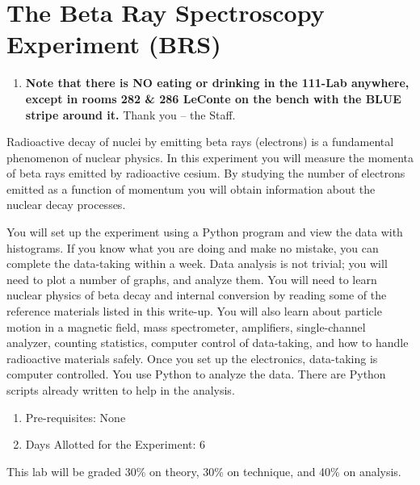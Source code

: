 \documentclass{../lab}
\begin{document}
\maketitle

\tableofcontents

\section{The Beta Ray Spectroscopy Experiment (BRS)}

\begin{enumerate}
    \item \textbf{Note that there is NO eating or drinking in the 111-Lab anywhere, except in rooms 282 \& 286 LeConte on the bench with the BLUE stripe around it.} Thank you -- the Staff.
\end{enumerate}

Radioactive decay of nuclei by emitting beta rays (electrons) is a fundamental phenomenon of nuclear physics. In this experiment you will measure the momenta of beta rays emitted by radioactive cesium. By studying the number of electrons emitted as a function of momentum you will obtain information about the nuclear decay processes.

You will set up the experiment using a Python program and view the data with histograms. If you know what you are doing and make no mistake, you can complete the data-taking within a week. Data analysis is not trivial; you will need to plot a number of graphs, and analyze them. You will need to learn nuclear physics of beta decay and internal conversion by reading some of the reference materials listed in this write-up. You will also learn about particle motion in a magnetic field, mass spectrometer, amplifiers, single-channel analyzer, counting statistics, computer control of data-taking, and how to handle radioactive materials safely. Once you set up the electronics, data-taking is computer controlled. You use Python to analyze the data. There are Python scripts already written to help in the analysis.

\begin{enumerate}
    \item Pre-requisites: None

    \item Days Allotted for the Experiment: 6
\end{enumerate}

This lab will be graded 30\% on theory, 30\% on technique, and 40\% on analysis.
\end{document}
